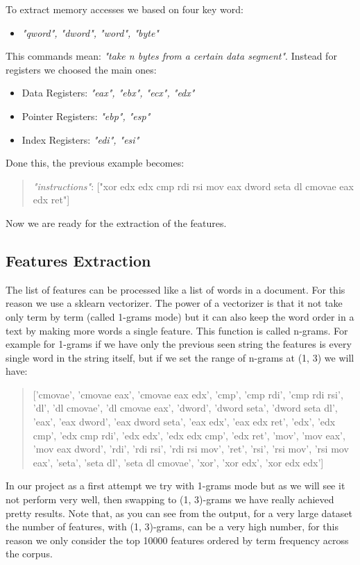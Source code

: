 \documentclass[12pt]{article}
\begin{document}
To extract memory accesses we based on four key word:
\begin{itemize}
\item {\em "qword", "dword", "word", "byte"}
\end{itemize}
This commands mean: {\em "take n bytes from a certain data segment"}.
Instead for registers we choosed the main ones:
\begin{itemize}
\item Data Registers: {\em "eax", "ebx", "ecx", "edx"}
\item Pointer Registers: {\em "ebp", "esp"}
\item Index Registers: {\em "edi", "esi"}
\end{itemize}

Done this, the previous example becomes:
\begin{quote}
{\em "instructions"}: ["xor edx edx cmp rdi rsi mov eax dword seta dl cmovae eax edx ret"]
\end{quote}

Now we are ready for the extraction of the features.

\subsection{Features Extraction}
The list of features can be processed like a list of words in a document. For this reason we use a sklearn vectorizer. The power of a vectorizer is that it not take only term by term (called 1-grams mode) but it can also keep the word order in a text by making more words a single feature. This function is called n-grams. For example for 1-grams if we have only the previous seen string the features is every single word in the string itself, but if we set the range of n-grams at (1, 3) we will have:
\begin{quote}
['cmovae', 'cmovae eax', 'cmovae eax edx', 'cmp', 'cmp rdi', 'cmp rdi rsi', 'dl', 'dl cmovae', 'dl cmovae eax', 'dword', 'dword seta', 'dword seta dl', 'eax', 'eax dword', 'eax dword seta', 'eax edx', 'eax edx ret', 'edx', 'edx cmp', 'edx cmp rdi', 'edx edx', 'edx edx cmp', 'edx ret', 'mov', 'mov eax', 'mov eax dword', 'rdi', 'rdi rsi', 'rdi rsi mov', 'ret', 'rsi', 'rsi mov', 'rsi mov eax', 'seta', 'seta dl', 'seta dl cmovae', 'xor', 'xor edx', 'xor edx edx']
\end{quote}

In our project as a first attempt we try with 1-grams mode but as we will see it not perform very well, then swapping to (1, 3)-grams we have really achieved pretty results. Note that, as you can see from the output, for a very large dataset the number of features, with (1, 3)-grams, can be a very high number, for this reason we only consider the top 10000 features ordered by term frequency across the corpus.
\end{document}
